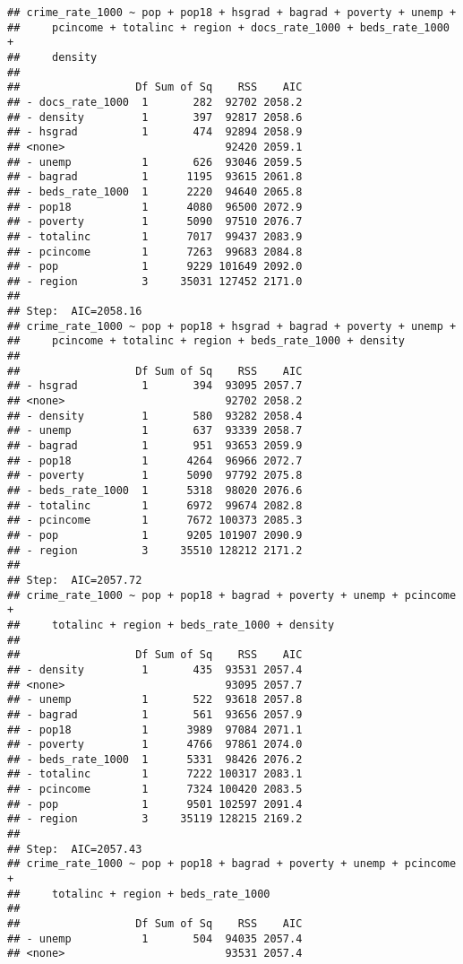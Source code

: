 \documentclass[
  11pt,
]{article}
\begin{document}
\begin{verbatim}
## crime_rate_1000 ~ pop + pop18 + hsgrad + bagrad + poverty + unemp + 
##     pcincome + totalinc + region + docs_rate_1000 + beds_rate_1000 + 
##     density
## 
##                  Df Sum of Sq    RSS    AIC
## - docs_rate_1000  1       282  92702 2058.2
## - density         1       397  92817 2058.6
## - hsgrad          1       474  92894 2058.9
## <none>                         92420 2059.1
## - unemp           1       626  93046 2059.5
## - bagrad          1      1195  93615 2061.8
## - beds_rate_1000  1      2220  94640 2065.8
## - pop18           1      4080  96500 2072.9
## - poverty         1      5090  97510 2076.7
## - totalinc        1      7017  99437 2083.9
## - pcincome        1      7263  99683 2084.8
## - pop             1      9229 101649 2092.0
## - region          3     35031 127452 2171.0
## 
## Step:  AIC=2058.16
## crime_rate_1000 ~ pop + pop18 + hsgrad + bagrad + poverty + unemp + 
##     pcincome + totalinc + region + beds_rate_1000 + density
## 
##                  Df Sum of Sq    RSS    AIC
## - hsgrad          1       394  93095 2057.7
## <none>                         92702 2058.2
## - density         1       580  93282 2058.4
## - unemp           1       637  93339 2058.7
## - bagrad          1       951  93653 2059.9
## - pop18           1      4264  96966 2072.7
## - poverty         1      5090  97792 2075.8
## - beds_rate_1000  1      5318  98020 2076.6
## - totalinc        1      6972  99674 2082.8
## - pcincome        1      7672 100373 2085.3
## - pop             1      9205 101907 2090.9
## - region          3     35510 128212 2171.2
## 
## Step:  AIC=2057.72
## crime_rate_1000 ~ pop + pop18 + bagrad + poverty + unemp + pcincome + 
##     totalinc + region + beds_rate_1000 + density
## 
##                  Df Sum of Sq    RSS    AIC
## - density         1       435  93531 2057.4
## <none>                         93095 2057.7
## - unemp           1       522  93618 2057.8
## - bagrad          1       561  93656 2057.9
## - pop18           1      3989  97084 2071.1
## - poverty         1      4766  97861 2074.0
## - beds_rate_1000  1      5331  98426 2076.2
## - totalinc        1      7222 100317 2083.1
## - pcincome        1      7324 100420 2083.5
## - pop             1      9501 102597 2091.4
## - region          3     35119 128215 2169.2
## 
## Step:  AIC=2057.43
## crime_rate_1000 ~ pop + pop18 + bagrad + poverty + unemp + pcincome + 
##     totalinc + region + beds_rate_1000
## 
##                  Df Sum of Sq    RSS    AIC
## - unemp           1       504  94035 2057.4
## <none>                         93531 2057.4

\end{verbatim}
\end{document}
